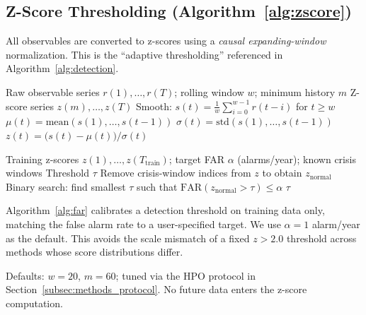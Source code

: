 \documentclass[3p]{elsarticle}
\begin{document}
\subsection{Z-Score Thresholding (Algorithm~\ref{alg:zscore})}%
\label{subsec:zscore}

All observables are converted to z-scores using a \emph{causal
expanding-window} normalization.  This is the ``adaptive thresholding''
referenced in Algorithm~\ref{alg:detection}.

\begin{algorithm}[htb]
\caption{Causal Expanding-Window Z-Score}\label{alg:zscore}
\begin{algorithmic}[1]
\Require Raw observable series $r(1), \ldots, r(T)$; rolling window
  $w$; minimum history $m$
\Ensure Z-score series $z(m), \ldots, z(T)$
\State Smooth: $s(t) = \frac{1}{w}\sum_{i=0}^{w-1} r(t-i)$ for
  $t \geq w$
  \State $\mu(t) = \mathrm{mean}(s(1), \ldots, s(t-1))$
  \State $\sigma(t) = \mathrm{std}(s(1), \ldots, s(t-1))$
  \State $z(t) = \bigl(s(t) - \mu(t)\bigr) / \sigma(t)$
\EndFor
\end{algorithmic}
\end{algorithm}

\begin{algorithm}[htb]
\caption{FAR-Calibrated Threshold}\label{alg:far}
\begin{algorithmic}[1]
\Require Training z-scores $z(1), \ldots, z(T_{\mathrm{train}})$;
  target FAR $\alpha$ (alarms/year); known crisis windows
\Ensure Threshold $\tau$
\State Remove crisis-window indices from $z$ to obtain $z_{\mathrm{normal}}$
\State Binary search: find smallest $\tau$ such that
  $\mathrm{FAR}(z_{\mathrm{normal}} > \tau) \leq \alpha$
\State \Return $\tau$
\end{algorithmic}
\end{algorithm}

\noindent Algorithm~\ref{alg:far} calibrates a detection threshold on
training data only, matching the false alarm rate to a user-specified
target.  We use $\alpha = 1$ alarm/year as the default.  This avoids
the scale mismatch of a fixed $z > 2.0$ threshold across methods
whose score distributions differ.

\noindent Defaults: $w = 20$, $m = 60$; tuned via the HPO protocol in
Section~\ref{subsec:methods_protocol}.  No future data enters the
z-score computation.

\end{document}
